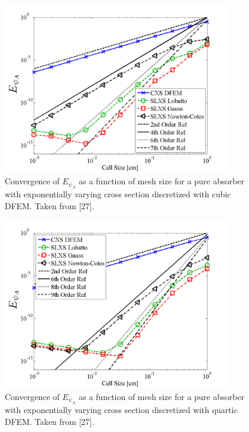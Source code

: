 %
\begin{figure}[!htp]
\centering
\includegraphics[width=10cm]{chapter3_variable_xs/P3_VarXS_E_psi_A.png}
\caption{Convergence of $E_{\psi_A}$   as a function of mesh size for a pure absorber with exponentially varying cross section discretized with cubic DFEM.  Taken from [27].}
\label{fig:varxs_psi_A_p3}
\end{figure}
%
%
\begin{figure}[!hbp]
\centering
\includegraphics[width=10cm]{chapter3_variable_xs/P4_VarXS_E_psi_A.png}
\caption{Convergence of $E_{\psi_A}$   as a function of mesh size for a pure absorber with exponentially varying cross section discretized with quartic DFEM.  Taken from [27].}
\label{fig:varxs_psi_A_p4}
\end{figure}
%


